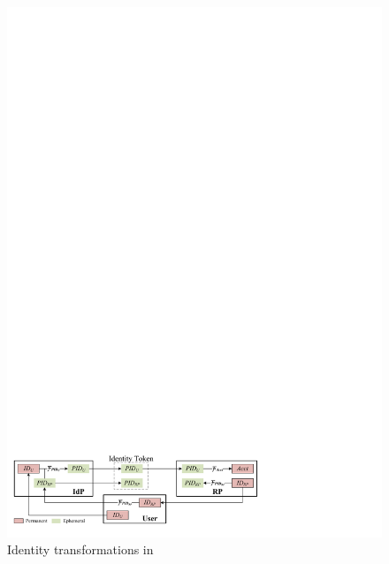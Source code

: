 \begin{figure}[tb]
  \centering
  \includegraphics[width=0.99\linewidth]{fig/IDCorrelation.pdf}
  \caption{Identity transformations in \usso} %
  \label{fig:IDCorrelation}
\end{figure}


